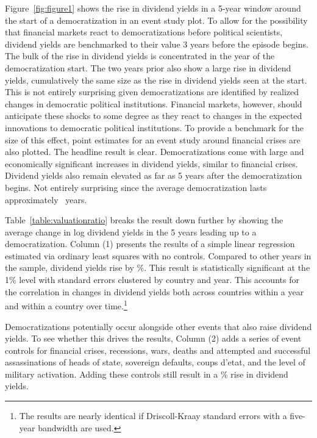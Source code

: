 \documentclass[12pt]{article}
\numberwithin{equation}{section}
\begin{document}
Figure~\ref{fig:figure1} shows the rise in dividend yields in a 5-year window around the start of a democratization in an event study plot. To allow for the possibility that financial markets react to democratizations before political scientists, dividend yields are benchmarked to their value 3 years before the episode begins. The bulk of the rise in dividend yields is concentrated in the year of the democratization start. The two years prior also show a large rise in dividend yields, cumulatively the same size as the rise in dividend yields seen at the start.  This is not entirely surprising given democratizations are identified by realized changes in democratic political institutions. Financial markets, however, should anticipate these shocks to some degree as they react to changes in the expected innovations to democratic political institutions. To provide a benchmark for the size of this effect, point estimates for an event study around financial crises are also plotted.  The headline result is clear. Democratizations come with large and economically significant increases in dividend yields, similar to financial crises.  Dividend yields also remain elevated as far as 5 years after the democratization begins. Not entirely surprising since the average democratization lasts approximately \avgDemEpisodeLengthInt\ years.

Table~\ref{table:valuationratio} breaks the result down further by showing the average change in log dividend yields in the 5 years leading up to a democratization. Column (1) presents the results of a simple linear regression estimated via ordinary least squares with no controls. Compared to other years in the sample, dividend yields rise by \tabOnecolOnePE\%.  This result is statistically significant at the 1\% level with standard errors clustered by country and year. This accounts for the correlation in changes in dividend yields both across countries within a year and within a country over time.\footnote{The results are nearly identical if Driscoll-Kraay standard errors with a five-year bandwidth are used.}

Democratizations potentially occur alongside other events that also raise dividend yields. To see whether this drives the results, Column (2) adds a series of event controls for financial crises, recessions, wars, deaths and attempted and successful assassinations of heads of state, sovereign defaults, coups d'etat, and the level of military activation. Adding these controls still result in a \tabOnecolTwoPE\% rise in dividend yields.
\end{document}
